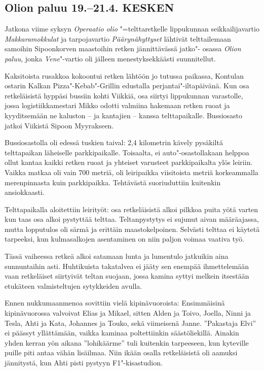\clearpage
\subsection{Olion paluu 19.--21.4. KESKEN}

\begin{multicols}{2}

	\noindent Jatkona viime syksyn \textit{Operaatio olio} "=telttaretkelle lippukunnan
	seikkailijavartio \textit{Makkaramokkulat} ja tarpojavartio \textit{Päärynähyttyset} lähtivät
	telttailemaan samoihin Sipoonkorven maastoihin retken jännittävässä jatko"-
	osassa \textit{Olion paluu}, jonka \textit{Vene}"-vartio oli jälleen menestyksekkäästi
	suunnitellut.

	Kaksitoista rusakkoa kokoontui retken lähtöön jo tutussa paikassa, Kontulan
	ostarin Kalkan Pizza"-Kebab"-Grillin edustalla perjantai"-iltapäivänä. Kun osa
	retkeläisistä hyppäsi bussiin kohti Viikkiä, osa siirtyi lippukunnan
	varastolle, jossa logistiikkamestari Mikko odotti valmiina hakemaan retken
	ruoat ja kyyditsemään ne kaluston -- ja kantajien -- kanssa telttapaikalle.
	Bussiosasto jatkoi Viikistä Sipoon Myyrakseen.

	Bussiosastolla oli edessä tuskien taival: 2,4 kilometrin kävely pysäkiltä
	telttapaikan läheiselle parkkipaikalle. Toisaalta, ei auto"-osastollakaan
	helppoa ollut kantaa kaikki retken ruoat ja yhteiset varusteet parkkipaikalta
	ylös leiriin. Vaikka matkaa oli vain 700 metriä, oli leiripaikka viisitoista
	metriä korkeammalla merenpinnasta kuin parkkipaikka. Tehtävästä suoriuduttiin
	kuitenkin ansiokkaasti.

	Telttapaikalla aloitettiin leirityöt: osa retkeläisistä alkoi pilkkoa puita
	yötä varten kun taas osa alkoi pystyttää telttaa. Teltanpystytys ei sujunut
	aivan määräajassa, mutta lopputulos oli särmä ja erittäin maastokelpoinen.
	Selvästi telttaa ei käytetä tarpeeksi, kun kulmasalkojen asentaminen on niin
	paljon voimaa vaativa työ.

	Tässä vaiheessa retkeä alkoi satamaan lunta ja lumentulo jatkuikin aina
	sunnuntaihin asti. Huhtikuista takatalvea ei jääty sen enempää ihmettelemään
	vaan retkeläiset siirtyivät teltan suojaan, jossa kamina syttyi melkein
	itsestään etukäteen valmisteltujen sytykkeiden avulla.

	Ennen nukkumaanmenoa sovittiin vielä kipinävuoroista: Ensimmäisinä
	kipinävuorossa valvoivat Elias ja Mikael, sitten Alden ja Toivo, Joella, Ninni
	ja Tesla, Ahti ja Kata, Johannes ja Touko, sekä viimeisenä Janne. ''Pakastaja
	Elvi'' ei päässyt yllättämään, vaikka kaminaa poltettiinkin säästöliekillä.
	Ainakin yhden kerran yön aikana ''lohikäärme'' tuli kuitenkin tarpeeseen, kun
	kyteville puille piti antaa vähän lisäilmaa. Niin ikään osalla retkeläisistä
	oli aamuksi jännitystä, kun Ahti pisti pystyyn F1"-kisastudion.


\end{multicols}
